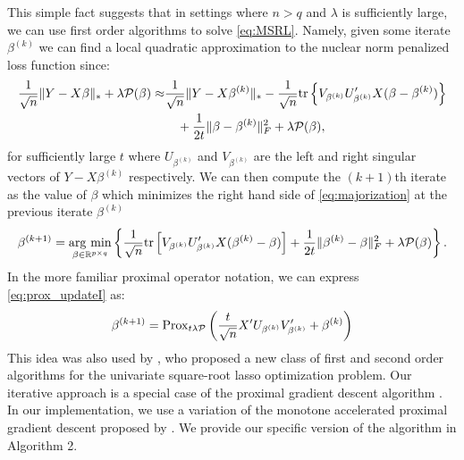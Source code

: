 \documentclass[12pt]{article}
\newcommand{\argmin}{\operatorname*{arg \ min}}
\begin{document}
This simple fact suggests that in settings where $n > q$ and $\lambda$ is sufficiently large, we can use first order algorithms to solve \eqref{eq:MSRL}.  Namely, given some iterate $\beta^{(k)}$ we can find a local quadratic approximation to the nuclear norm penalized loss function since: 
\begin{align}\label{eq:majorization}
\frac{1}{\sqrt{n}} \|Y - X\beta\|_*  + \lambda \mathcal{P}(\beta) \approx&  \frac{1}{\sqrt{n}} \|Y - X\beta^{(k)}\|_* - \frac{1}{\sqrt{n}} {\rm tr}\left\{ V_{\beta^{(k)}}U_{\beta^{(k)}}'X(\beta - \beta^{(k)})\right\} \notag \\
 & \quad + \frac{1}{2t}\|\beta - \beta^{(k)}\|_F^2 + \lambda \mathcal{P}(\beta),
\end{align}
for sufficiently large $t$ where $U_{\beta^{(k)}}$ and $V_{\beta^{(k)}}$ are the left and right singular vectors of $Y - X\beta^{(k)}$ respectively. 
We can then compute the $(k+1)$th iterate as the value of $\beta$ which minimizes the right hand side of \eqref{eq:majorization} at the previous iterate $\beta^{(k)}$
\begin{equation}\label{eq:prox_updateI}
\beta^{(k+1)} = \argmin_{\beta \in \mathbb{R}^{p \times q}} \left\{ \frac{1}{\sqrt{n}} {\rm tr}\left[ V_{\beta^{(k)}}U_{\beta^{(k)}}'X(\beta^{(k)} - \beta)\right] + \frac{1}{2t}\| \beta^{(k)} - \beta\|_F^2 + \lambda \mathcal{P}(\beta) \right\}.
\end{equation}
In the more familiar proximal operator notation, we can express \eqref{eq:prox_updateI} as: 
\begin{equation}
\beta^{(k+1)}  = {\rm Prox}_{t\lambda \mathcal{P}}\left(\frac{t}{\sqrt{n}}X'U_{\beta^{(k)}}V_{\beta^{(k)}}' + \beta^{(k)} \right)\notag
\end{equation}
This idea was also used by \citet{li2016fast}, who proposed a new class of first and second order algorithms for the univariate square-root lasso optimization problem. 
Our iterative approach is a special case of the proximal gradient descent algorithm \citep{parikh2014proximal}. In our implementation, we use a variation of the monotone accelerated proximal gradient descent proposed by \citet{beck2009fast}. We provide our specific version of the algorithm in Algorithm 2. 
\end{document}
